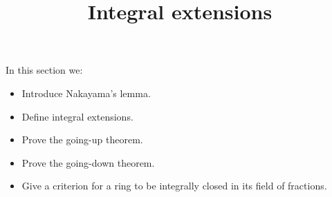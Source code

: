 \documentclass{ximera}
\title{Integral extensions}
\begin{document}
\begin{abstract}
\end{abstract}

\maketitle

In this section we:

\begin{itemize}
\item Introduce Nakayama's lemma.
\item Define integral extensions.
\item Prove the going-up theorem.
\item Prove the going-down theorem.
\item Give a criterion for a ring to be integrally closed in its field
  of fractions.
\end{itemize}
\end{document}
